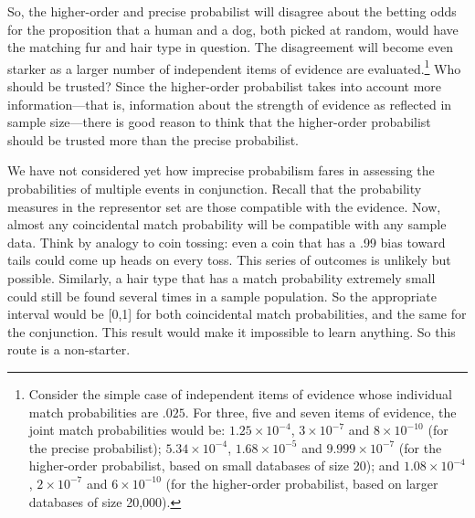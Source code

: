 \documentclass[
  letterpaper,
  DIV=11,
  numbers=noendperiod]{scrartcl}
\begin{document}
So, the higher-order and precise probabilist will disagree about the
betting odds for the proposition that a human and a dog, both picked at
random, would have the matching fur and hair type in question. The
disagreement will become even starker as a larger number of independent
items of evidence are evaluated.\footnote{Consider the simple case of
  independent items of evidence whose individual match probabilities are
  \(.025\). For three, five and seven items of evidence, the joint match
  probabilities would be: \ensuremath{1.25\times 10^{-4}},
  \ensuremath{3\times 10^{-7}} and \ensuremath{8\times 10^{-10}} (for
  the precise probabilist); \ensuremath{5.34\times 10^{-4}},
  \ensuremath{1.68\times 10^{-5}} and \ensuremath{9.999\times 10^{-7}}
  (for the higher-order probabilist, based on small databases of size
  20); and \ensuremath{1.08\times 10^{-4}}, \ensuremath{2\times 10^{-7}}
  and \ensuremath{6\times 10^{-10}} (for the higher-order probabilist,
  based on larger databases of size 20,000).} Who should be trusted?
Since the higher-order probabilist takes into account more
information---that is, information about the strength of evidence as
reflected in sample size---there is good reason to think that the
higher-order probabilist should be trusted more than the precise
probabilist.

We have not considered yet how imprecise probabilism fares in assessing
the probabilities of multiple events in conjunction. Recall that the
probability measures in the representor set are those compatible with
the evidence. Now, almost any coincidental match probability will be
compatible with any sample data. Think by analogy to coin tossing: even
a coin that has a .99 bias toward tails could come up heads on every
toss. This series of outcomes is unlikely but possible. Similarly, a
hair type that has a match probability extremely small could still be
found several times in a sample population. So the appropriate interval
would be {[}0,1{]} for both coincidental match probabilities, and the
same for the conjunction. This result would make it impossible to learn
anything. So this route is a non-starter.
\end{document}
